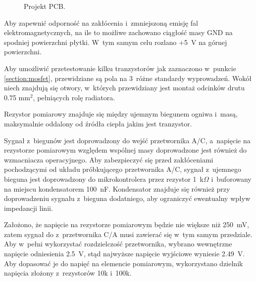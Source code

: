 \documentclass[polish,engineer]{polsl-msth}
\begin{document}
\begin{figure}[hbtp]
     \caption{Projekt PCB. \label{img:pcb_colored}}
\end{figure}

Aby zapewnić odporność na zakłócenia i~zmniejszoną emisję fal elektromagnetycznych, na ile to możliwe zachowano ciągłość masy GND na spodniej powierzchni płytki. W~tym samym celu rozlano +5~V na górnej powierzchni. 

Aby umożliwić przetestowanie kilku tranzystorów jak zaznaczono w~punkcie \ref{section:mosfet}, przewidziane są pola na 3~różne standardy wyprowadzeń. Wokół niech znajdują się otwory, w~których przewidziany jest montaż odcinków drutu 0.75 mm$^2$, pełniących rolę radiatora.

Rezystor pomiarowy znajduje się między ujemnym biegunem ogniwa i~masą, maksymalnie oddalony od źródła ciepła jakim jest tranzystor. 

Sygnał z~biegunów jest doprowadzony do wejść przetwornika A/C, a~napięcie na rezystorze pomiarowym względem wspólnej masy doprowadzone jest również do wzmacniacza operacyjnego. Aby zabezpieczyć się przed zakłóceniami pochodzącymi od układu próbkującego przetwornika A/C, sygnał z~ujemnego bieguna jest doprowadzony do mikrokontrolera przez rezystor 1~k$\Omega$ i~buforowany na miejscu kondensatorem 100~nF. Kondensator znajduje się również przy doprowadzeniu sygnału z~bieguna dodatniego, aby ograniczyć ewentualny wpływ impedancji linii.

Założono, że napięcie na rezystorze pomiarowym będzie nie większe niż 250~mV, zatem sygnał do z~przetwornika C/A musi zawierać się w~tym samym przedziale. Aby w~pełni wykorzystać rozdzielczość przetwornika, wybrano wewnętrzne napięcie odniesienia 2.5~V, stąd najwyższe napięcie wyjściowe wyniesie 2.49~V. Aby dopasować je do napięć na elemencie pomiarowym, wykorzystano dzielnik napięcia złożony z~rezystorów 10k i~100k.
\end{document}
